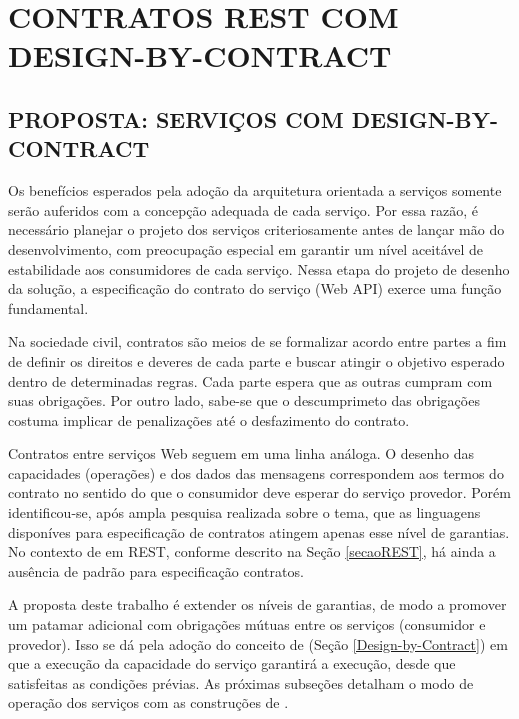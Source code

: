 \chapter{CONTRATOS REST COM DESIGN-BY-CONTRACT}


\section{PROPOSTA: SERVIÇOS COM DESIGN-BY-CONTRACT}
\label{PropostaServicoDbC}
\vspace{-6mm}

Os benefícios esperados pela adoção da arquitetura orientada a serviços
somente serão auferidos com a concepção adequada de cada serviço. 
Por essa razão, é necessário planejar o projeto dos serviços criteriosamente
antes de lançar mão do desenvolvimento, com preocupação especial em garantir
um nível aceitável de estabilidade aos consumidores de cada serviço.
Nessa etapa do projeto de desenho da solução, a especificação do contrato do
serviço (Web API) exerce uma função fundamental. 

Na sociedade civil, contratos são meios de se formalizar acordo entre partes a
fim de definir os direitos e deveres de cada parte e buscar atingir o
objetivo esperado dentro de determinadas regras. Cada parte espera que as outras
cumpram com suas obrigações.
Por outro lado, sabe-se que o descumprimeto das obrigações costuma implicar de
penalizações até o desfazimento do contrato. 

Contratos entre serviços Web seguem em uma linha análoga. O desenho das
capacidades (operações) e dos dados das mensagens correspondem aos
termos do contrato no sentido do que o consumidor deve esperar do serviço
provedor. Porém identificou-se, após ampla pesquisa realizada sobre o tema, que
as linguagens disponíves para especificação de contratos atingem apenas esse
nível de garantias. No contexto de \wss{} em REST, conforme descrito na
Seção \ref{secaoREST}, há ainda a ausência de padrão para especificação
contratos.

A proposta deste trabalho é extender os níveis de garantias, de modo a promover
um patamar adicional com obrigações mútuas entre os serviços (consumidor e
provedor). Isso se dá pela adoção do conceito de \designbycontract{} (Seção 
\ref{Design-by-Contract}) em que a execução da capacidade do serviço garantirá 
a execução, desde que satisfeitas as condições prévias. As próximas subseções 
detalham o modo de operação dos serviços com as construções de \designbycontract{}.

